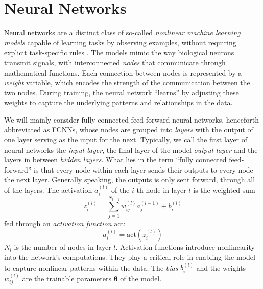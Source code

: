 \documentclass[a4paper, UKenglish, 11pt]{uiomaster}
\begin{document}
\section{Neural Networks}

Neural networks are a distinct class of so-called \emph{nonlinear machine learning models} capable of learning tasks by observing examples, without requiring explicit task-specific rules \cite{Hjorth-Jensen2022}. The models mimic the way biological neurons transmit signals, with interconnected \emph{nodes} that communicate through mathematical functions. Each connection between nodes is represented by a \emph{weight} variable, which encodes the strength of the communication between the two nodes. During training, the neural network ``learns'' by adjusting these weights to capture the underlying patterns and relationships in the data.

We will mainly consider fully connected feed-forward neural networks, henceforth abbreviated as FCNNs, whose nodes are grouped into \emph{layers} with the output of one layer serving as the input for the next. Typically, we call the first layer of neural networks the \emph{input layer}, the final layer of the model \emph{output layer} and the layers in between \emph{hidden layers}. What lies in the term ``fully connected feed-forward'' is that every node within each layer sends their outputs to every node the next layer. Generally speaking, the outputs is only sent forward, through all of the layers.
The activation $a_i^{(l)}$ of the $i$-th node in layer $l$ is the weighted sum
\begin{equation}
  z_i^{(l)} = \sum_{j=1}^{N_{l-1}} w_{ij}^{(l)} a_{j}^{(l-1)} + b_i^{(l)}
  \label{activation_node}
\end{equation}
fed through an \emph{activation function} \(\text{act}\):
\begin{equation}
  a_i^{(l)} = \text{act} \left( z_i^{(l)} \right)
\end{equation}
$N_{l}$ is the number of nodes in layer \(l\).
Activation functions introduce nonlinearity into the network's computations. They play a critical role in enabling the model to capture nonlinear patterns within the data. The \emph{bias} \(b_i^{(l)}\) and the weights \(w_{ij}^{(l)}\) are the trainable parameters \(\boldsymbol \theta\) of the model.


\end{document}
